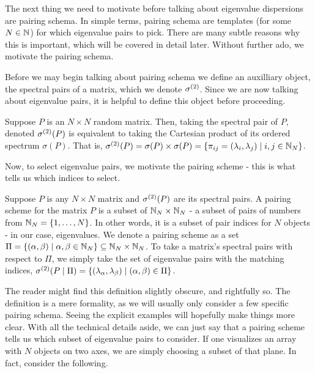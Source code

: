 The next thing we need to motivate before talking about eigenvalue dispersions are pairing schema.
In simple terms, pairing schema are templates (for some $N \in \mathbb{N}$) for which eigenvalue pairs to pick.
There are many subtle reasons why this is important, which will be covered in detail later.
Without further ado, we motivate the pairing schema.

Before we may begin talking about pairing schema we define an auxilliary object, the spectral pairs of a matrix, which we denote ${\sigma^{(2)}}$.
Since we are now talking about eigenvalue pairs, it is helpful to define this object before proceeding.

\begin{definition}
Suppose $P$ is an $N \times N$ random matrix. Then, taking the spectral pair of $P$, denoted ${\sigma^{(2)}}(P)$ is equivalent to taking the Cartesian product of its ordered spectrum $\sigma(P)$.
That is, ${\sigma^{(2)}}(P) = \sigma(P) \times \sigma(P) = \{{\pi_{ij}} = (\lambda_i, \lambda_j) \mid i,j \in \mathbb{N}_N\}$.
\end{definition}

Now, to select eigenvalue pairs, we motivate the pairing scheme - this is what tells us which indices to select.

\begin{definition}
Suppose $P$ is any $N \times N$ matrix and ${\sigma^{(2)}}(P)$ are its spectral pairs.
A pairing scheme for the matrix $P$ is a subset of $\mathbb{N}_N \times \mathbb{N}_N$ - a subset of pairs of numbers from $\mathbb{N}_N = \{1, \dots, N\}$.
In other words, it is a subset of pair indices for $N$ objects - in our case, eigenvalues.
We denote a pairing scheme as a set $\Pi = \{(\alpha, \beta) \mid \alpha, \beta \in \mathbb{N}_N\} \subseteq \mathbb{N}_N \times \mathbb{N}_N$.
To take a matrix's spectral pairs with respect to $\Pi$, we simply take the set of eigenvalue pairs with the matching indices,
${\sigma^{(2)}}(P \mid \Pi) = \{(\lambda_{\alpha},\lambda_{\beta}) \mid ({\alpha},{\beta}) \in \Pi\}$.
\end{definition}

The reader might find this definition slightly obscure, and rightfully so.
The definition is a mere formality, as we will usually only consider a few specific pairing schema.
Seeing the explicit examples will hopefully make things more clear.
With all the technical details aside, we can just say that a pairing scheme tells us which subset of eigenvalue pairs to consider.
If one visualizes an array with $N$ objects on two axes, we are simply choosing a subset of that plane.
In fact, consider the following.

